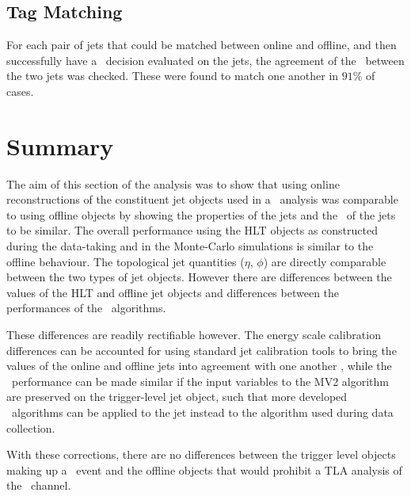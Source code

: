 	\subsection{Tag Matching}

	For each pair of jets that could be matched between online and offline, and then successfully have a \btag\, decision evaluated on the jets, the agreement of the \btag\, between the two jets was checked. These were found to match one another in $91\%$ of cases.

	\section{Summary}

	The aim of this section of the analysis was to show that using online reconstructions of the constituent jet objects used in a \VBFHBB\ analysis was comparable to using offline objects by showing the properties of the jets and the \btag\ of the jets to be similar. The overall performance using the HLT objects as constructed during the data-taking and in the Monte-Carlo simulations is similar to the offline behaviour. The topological jet quantities ($\eta$, $\phi$) are directly comparable between the two types of jet objects. However there are differences between the \pt values of the HLT and offline jet objects and differences between the performances of the \btag\ algorithms.

	These differences are readily rectifiable however. The energy scale calibration differences can be accounted for using standard jet calibration tools to bring the \pt values of the online and offline jets into agreement with one another \cite{JES}, while the \btag\ performance can be made similar if the input variables to the MV2 algorithm are preserved on the trigger-level jet object, such that more developed \btag\ algorithms can be applied to the jet instead to the algorithm used during data collection.

	With these corrections, there are no differences between the trigger level objects making up a \VBFHBB\ event and the offline objects that would prohibit a TLA analysis of the \VBFHBB\ channel.

\endinput
